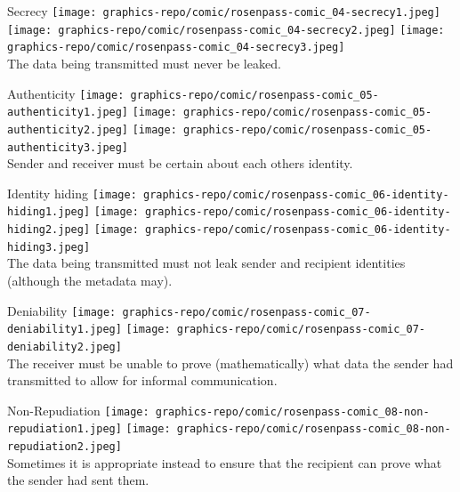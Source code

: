 \begin{frame}{Secrecy}
  \centering
  \texttt{[image: graphics-repo/comic/rosenpass-comic\_04-secrecy1.jpeg]}
  \texttt{[image: graphics-repo/comic/rosenpass-comic\_04-secrecy2.jpeg]}
  \texttt{[image: graphics-repo/comic/rosenpass-comic\_04-secrecy3.jpeg]}
  \large
  \\ The data being transmitted must never be leaked.
\end{frame}

\begin{frame}{Authenticity}
  \centering
  \texttt{[image: graphics-repo/comic/rosenpass-comic\_05-authenticity1.jpeg]}
  \texttt{[image: graphics-repo/comic/rosenpass-comic\_05-authenticity2.jpeg]}
  \texttt{[image: graphics-repo/comic/rosenpass-comic\_05-authenticity3.jpeg]}
  \large
  \\ Sender and receiver must be certain about each others identity.
\end{frame}

\begin{frame}{Identity hiding}
  \centering
  \texttt{[image: graphics-repo/comic/rosenpass-comic\_06-identity-hiding1.jpeg]}
  \texttt{[image: graphics-repo/comic/rosenpass-comic\_06-identity-hiding2.jpeg]}
  \texttt{[image: graphics-repo/comic/rosenpass-comic\_06-identity-hiding3.jpeg]}
  \large
  \\ The data being transmitted must not leak sender and recipient identities (although the metadata may).
\end{frame}

\begin{frame}{Deniability}
  \centering
  \texttt{[image: graphics-repo/comic/rosenpass-comic\_07-deniability1.jpeg]}
  \texttt{[image: graphics-repo/comic/rosenpass-comic\_07-deniability2.jpeg]}
  \large
  \\ The receiver must be unable to prove (mathematically) what data the sender had transmitted to allow for informal communication.
\end{frame}

\begin{frame}{Non-Repudiation}
  \centering
  \texttt{[image: graphics-repo/comic/rosenpass-comic\_08-non-repudiation1.jpeg]}
  \texttt{[image: graphics-repo/comic/rosenpass-comic\_08-non-repudiation2.jpeg]}
  \large
  \\ Sometimes it is appropriate instead to ensure that the recipient can prove what the sender had sent them.
\end{frame}

